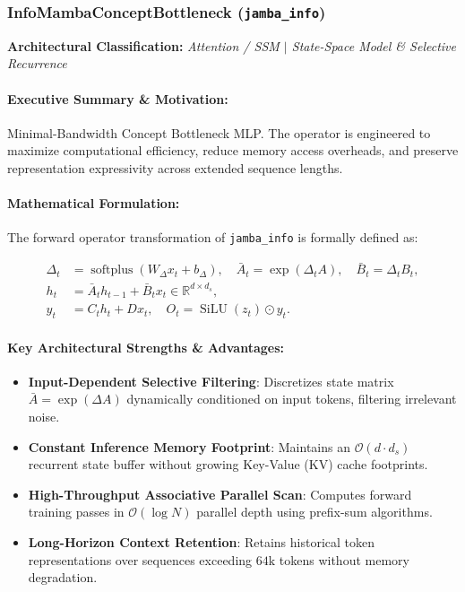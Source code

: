 \subsubsection{InfoMambaConceptBottleneck (\texttt{jamba\_info})}
\label{sec:module_jamba\_info}

\textbf{Architectural Classification:} \textit{Attention / SSM $\mid$ State-Space Model & Selective Recurrence}

\paragraph{Executive Summary \& Motivation:}
Minimal-Bandwidth Concept Bottleneck MLP. The operator is engineered to maximize computational efficiency, reduce memory access overheads, and preserve representation expressivity across extended sequence lengths.

\paragraph{Mathematical Formulation:}
The forward operator transformation of \texttt{jamba\_info} is formally defined as:

\begin{align}
\Delta_t &= \operatorname{softplus}(W_\Delta x_t + b_\Delta), \quad \bar{A}_t = \exp(\Delta_t A), \quad \bar{B}_t = \Delta_t B_t, \\
h_t &= \bar{A}_t h_{t-1} + \bar{B}_t x_t \in \mathbb{R}^{d \times d_s}, \\
y_t &= C_t h_t + D x_t, \quad O_t = \operatorname{SiLU}(z_t) \odot y_t.
\end{align}


\paragraph{Key Architectural Strengths \& Advantages:}
\begin{itemize}
    \item \textbf{Input-Dependent Selective Filtering}: Discretizes state matrix $\bar{A} = \exp(\Delta A)$ dynamically conditioned on input tokens, filtering irrelevant noise.
    \item \textbf{Constant Inference Memory Footprint}: Maintains an $\mathcal{O}(d \cdot d_s)$ recurrent state buffer without growing Key-Value (KV) cache footprints.
    \item \textbf{High-Throughput Associative Parallel Scan}: Computes forward training passes in $\mathcal{O}(\log N)$ parallel depth using prefix-sum algorithms.
    \item \textbf{Long-Horizon Context Retention}: Retains historical token representations over sequences exceeding $64\text{k}$ tokens without memory degradation.
\end{itemize}

